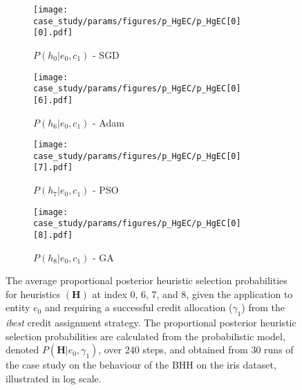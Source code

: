 \begin{figure}[htb]
      \begin{subfigure}{0.5\textwidth}
            \centering
            \texttt{[image: case\_study/params/figures/p\_HgEC/p\_HgEC[0][0].pdf]}
            \caption{$P(h_{0} \vert e_{0}, c_{1})$ - \acs{SGD}}
            \label{fig:results:case_study:p_HgEC:0:0}
      \end{subfigure}
      \begin{subfigure}{0.5\textwidth}
            \centering
            \texttt{[image: case\_study/params/figures/p\_HgEC/p\_HgEC[0][6].pdf]}
            \caption{$P(h_{6} \vert e_{0}, c_{1})$ - \acs{Adam}}
            \label{fig:results:case_study:p_HgEC:0:6}
      \end{subfigure}
      \par\bigskip
      \begin{subfigure}{0.5\textwidth}
            \centering
            \texttt{[image: case\_study/params/figures/p\_HgEC/p\_HgEC[0][7].pdf]}
            \caption{$P(h_{7} \vert e_{0}, c_{1})$ - \acs{PSO}}
            \label{fig:results:case_study:p_HgEC:0:7}
      \end{subfigure}
      \begin{subfigure}{0.5\textwidth}
            \centering
            \texttt{[image: case\_study/params/figures/p\_HgEC/p\_HgEC[0][8].pdf]}
            \caption{$P(h_{8} \vert e_{0}, c_{1})$ - \acs{GA}}
            \label{fig:results:case_study:p_HgEC:0:8}
      \end{subfigure}
      \par\bigskip
      \caption{The average proportional posterior heuristic selection probabilities for heuristics $(\boldsymbol{H})$ at index 0, 6, 7, and 8, given the application to entity $e_{0}$ and requiring a successful credit allocation ($\gamma_{1}$) from the \textit{ibest} credit assignment strategy. The proportional posterior heuristic selection probabilities are calculated from the probabilistic model, denoted $P(\boldsymbol{H} \vert e_{0}, \gamma_{1})$, over 240 steps, and obtained from 30 runs of the case study on the behaviour of the \acs{BHH} on the iris dataset, illustrated in log scale.}
      \label{fig:results:case_study:p_HgEC:0}
\end{figure}

